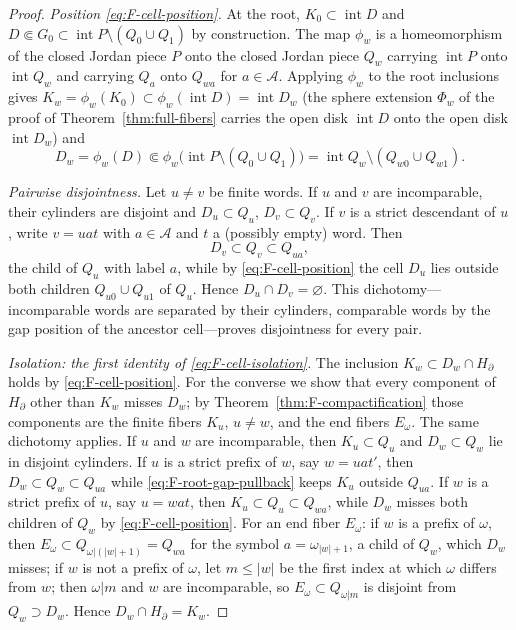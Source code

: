 \documentclass[11pt,reqno]{amsart}
\theoremstyle{definition}
\theoremstyle{remark}
\newcommand{\Int}{\operatorname{int}}
\begin{document}
\begin{proof}
\emph{Position \eqref{eq:F-cell-position}.}
At the root, $K_0\subset\Int D$ and
$D\Subset G_0\subset\Int P\setminus(Q_0\cup Q_1)$ by construction.  The
map $\phi_w$ is a homeomorphism of the closed Jordan piece $P$ onto the
closed Jordan piece $Q_w$ carrying $\Int P$ onto $\Int Q_w$ and carrying
$Q_a$ onto $Q_{wa}$ for $a\in\mathcal A$.  Applying $\phi_w$ to the root
inclusions gives
$K_w=\phi_w(K_0)\subset\phi_w(\Int D)=\Int D_w$ (the sphere extension
$\Phi_w$ of the proof of Theorem~\ref{thm:full-fibers} carries the open
disk $\Int D$ onto the open disk $\Int D_w$) and
\[
D_w=\phi_w(D)
\Subset\phi_w\bigl(\Int P\setminus(Q_0\cup Q_1)\bigr)
=\Int Q_w\setminus(Q_{w0}\cup Q_{w1}).
\]

\emph{Pairwise disjointness.}
Let $u\ne v$ be finite words.  If $u$ and $v$ are incomparable, their
cylinders are disjoint and $D_u\subset Q_u$, $D_v\subset Q_v$.  If $v$ is
a strict descendant of $u$, write $v=uat$ with $a\in\mathcal A$ and $t$ a
(possibly empty) word.  Then
\[
D_v\subset Q_v\subset Q_{ua},
\]
the child of $Q_u$ with label $a$, while by
\eqref{eq:F-cell-position} the cell $D_u$ lies outside both children
$Q_{u0}\cup Q_{u1}$ of $Q_u$.  Hence $D_u\cap D_v=\varnothing$.  This
dichotomy---incomparable words are separated by their cylinders,
comparable words by the gap position of the ancestor cell---proves
disjointness for every pair.

\emph{Isolation: the first identity of \eqref{eq:F-cell-isolation}.}
The inclusion $K_w\subset D_w\cap H_\partial$ holds by
\eqref{eq:F-cell-position}.  For the converse we show that every
component of $H_\partial$ other than $K_w$ misses $D_w$; by
Theorem~\ref{thm:F-compactification} those components are the finite
fibers $K_u$, $u\ne w$, and the end fibers $E_\omega$.  The same
dichotomy applies.  If $u$ and $w$ are incomparable, then
$K_u\subset Q_u$ and $D_w\subset Q_w$ lie in disjoint cylinders.  If $u$
is a strict prefix of $w$, say $w=uat'$, then $D_w\subset Q_w\subset
Q_{ua}$ while \eqref{eq:F-root-gap-pullback} keeps $K_u$ outside
$Q_{ua}$.  If $w$ is a strict prefix of $u$, say $u=wat$, then
$K_u\subset Q_u\subset Q_{wa}$, while $D_w$ misses both children of
$Q_w$ by \eqref{eq:F-cell-position}.  For an end fiber $E_\omega$: if $w$
is a prefix of $\omega$, then
$E_\omega\subset Q_{\omega|(|w|+1)}=Q_{wa}$ for the symbol
$a=\omega_{|w|+1}$, a child of $Q_w$, which $D_w$ misses; if $w$ is not a
prefix of $\omega$, let $m\le|w|$ be the first index at which $\omega$
differs from $w$; then $\omega|m$ and $w$ are incomparable, so
$E_\omega\subset Q_{\omega|m}$ is disjoint from $Q_w\supset D_w$.  Hence
$D_w\cap H_\partial=K_w$.


\end{proof}
\end{document}
